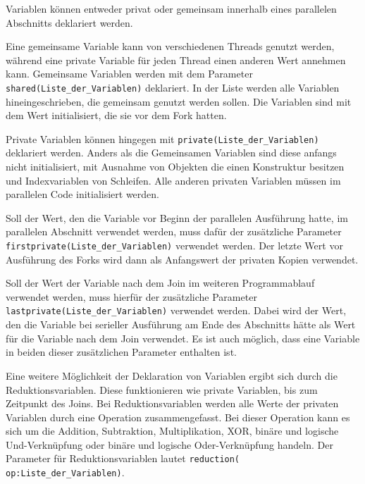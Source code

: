 \documentclass[../main.tex]{subfiles}
\begin{document}
Variablen können entweder privat oder gemeinsam innerhalb eines parallelen Abschnitts deklariert werden. \par Eine gemeinsame Variable kann von verschiedenen Threads genutzt werden, während eine private Variable für jeden Thread einen anderen Wert annehmen kann. Gemeinsame Variablen werden mit dem Parameter \texttt{shared(Liste\_der\_Variablen)} deklariert. In der Liste werden alle Variablen hineingeschrieben, die gemeinsam genutzt werden sollen. Die Variablen sind mit dem Wert initialisiert, die sie vor dem Fork hatten. \par Private Variablen können hingegen mit \texttt{private(Liste\_der\_Variablen)} deklariert werden.  Anders als die Gemeinsamen Variablen sind diese anfangs nicht initialisiert, mit Ausnahme von Objekten die einen Konstruktur besitzen und Indexvariablen von Schleifen. Alle anderen privaten Variablen müssen im parallelen Code initialisiert werden. \par
Soll der Wert, den die Variable vor Beginn der parallelen Ausführung hatte, im parallelen Abschnitt verwendet werden, muss dafür der zusätzliche Parameter \texttt{firstprivate(Liste\_der\_Variablen)} verwendet werden. Der letzte Wert vor Ausführung des Forks wird dann als Anfangswert der privaten Kopien verwendet. \par Soll der Wert der Variable nach dem Join im weiteren Programmablauf verwendet werden, muss hierfür der zusätzliche Parameter \texttt{lastprivate(Liste\_der\_Variablen)} verwendet werden. Dabei wird der Wert, den die Variable bei serieller Ausführung am Ende des Abschnitts hätte als Wert für die Variable nach dem Join verwendet. Es ist auch möglich, dass eine Variable in beiden dieser zusätzlichen Parameter enthalten ist.

Eine weitere Möglichkeit der Deklaration von Variablen ergibt sich durch die Reduktionsvariablen. Diese funktionieren wie private Variablen, bis zum Zeitpunkt des Joins. Bei Reduktionsvariablen werden alle Werte der privaten Variablen durch eine Operation zusammengefasst. Bei dieser Operation kann es sich um die Addition, Subtraktion, Multiplikation, XOR, binäre und logische Und-Verknüpfung oder binäre und logische Oder-Verknüpfung handeln. Der Parameter für Reduktionsvariablen lautet \texttt{reduction( op:Liste\_der\_Variablen)}.
\end{document}
